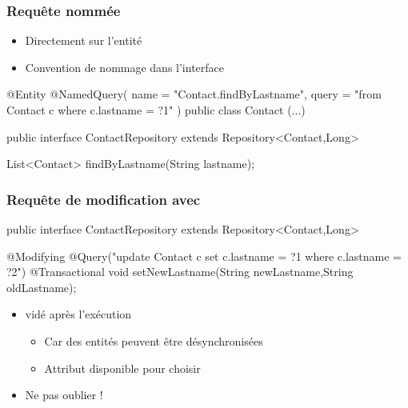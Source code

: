 \begin{frame}[fragile]
 \frametitle{Requête nommée}
 \begin{itemize}
  \item Directement sur l'entité
  \item Convention de nommage dans l'interface
 \end{itemize}
 \begin{javacode}
@Entity
@NamedQuery(
  name = "Contact.findByLastname",
  query = "from Contact c where c.lastname = ?1"
)
public class Contact { (...) }

public interface ContactRepository extends Repository<Contact,Long> {

  List<Contact> findByLastname(String lastname);

}
 \end{javacode}

\end{frame}

\begin{frame}[fragile]
 \frametitle{Requête de modification avec }
  \begin{javacode}
public interface ContactRepository extends Repository<Contact,Long> {

  @Modifying
  @Query("update Contact c set c.lastname = ?1 where c.lastname = ?2")
  @Transactional
  void setNewLastname(String newLastname,String oldLastname);

}
 \end{javacode}
 \begin{itemize}
  \item {} vidé après l'exécution
  \begin{itemize}
    \item Car des entités peuvent être désynchronisées
    \item Attribut  disponible pour choisir
  \end{itemize}
  \item Ne pas oublier  !
 \end{itemize}
\end{frame}